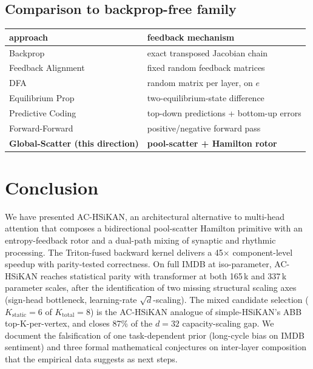 \documentclass[11pt, a4paper]{article}
\begin{document}
\subsection{Comparison to backprop-free family}

\begin{center}
\begin{tabular}{ll}
\toprule
approach & feedback mechanism \\
\midrule
Backprop                                       & exact transposed Jacobian chain \\
Feedback Alignment~\cite{lillicrap2016random}  & fixed random feedback matrices \\
DFA~\cite{nokland2016direct}                   & random matrix per layer, on $e$ \\
Equilibrium Prop~\cite{scellier2017equilibrium}& two-equilibrium-state difference \\
Predictive Coding~\cite{whittington2017approximation} & top-down predictions + bottom-up errors \\
Forward-Forward~\cite{hinton2022forward}       & positive/negative forward pass \\
\textbf{Global-Scatter (this direction)}       & \textbf{pool-scatter + Hamilton rotor} \\
\bottomrule
\end{tabular}
\end{center}

\section{Conclusion}

We have presented AC-HSiKAN, an architectural alternative to
multi-head attention that composes a bidirectional pool-scatter Hamilton
primitive with an entropy-feedback rotor and a dual-path mixing of
synaptic and rhythmic processing. The Triton-fused backward kernel
delivers a 45$\times$ component-level speedup with parity-tested
correctness. On full IMDB at iso-parameter, AC-HSiKAN reaches
statistical parity with transformer at both 165\,k and 337\,k
parameter scales, after the identification of two missing structural
scaling axes (sign-head bottleneck, learning-rate $\sqrt{d}$-scaling).
The mixed candidate selection ($K_{\text{static}} = 6$ of
$K_{\text{total}} = 8$) is the AC-HSiKAN analogue of simple-HSiKAN's
ABB top-K-per-vertex, and closes 87\% of the $d=32$ capacity-scaling
gap. We document the falsification of one task-dependent prior
(long-cycle bias on IMDB sentiment) and three formal mathematical
conjectures on inter-layer composition that the empirical data
suggests as next steps.
\end{document}
